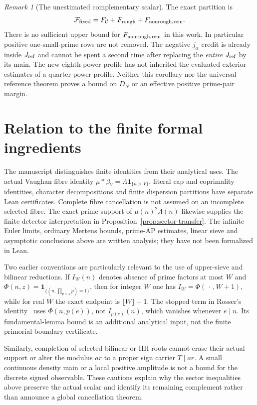 \documentclass[11pt,a4paper]{article}
\theoremstyle{definition}
\theoremstyle{remark}
\newtheorem{remark}[theorem]{Remark}
\begin{document}
\begin{remark}[The unestimated complementary scalar]
The exact partition is
\[
 \mathcal F_{\rm fixed}
       =F_{\mathcal C}+F_{\rm rough}+F_{\rm nonrough,rem}.
\]
There is no sufficient upper bound for $F_{\rm nonrough,rem}$
in this work.  In particular positive one-small-prime rows are
not removed.  The negative $j_\alpha$ credit is already inside
$J_{\rm ref}$ and cannot be spent a second time after replacing
the \emph{entire} $J_{\rm ref}$ by its main.  The new
eighth-power profile has not inherited the evaluated exterior
estimates of a quarter-power profile.  Neither this corollary
nor the universal reference theorem proves a bound on $D_N$
or an effective positive prime-pair margin.
\end{remark}

\section{Relation to the finite formal ingredients}
\label{sec:sector-formal-boundary}

The manuscript distinguishes finite identities from their analytical
uses.  The actual Vaughan fibre identity
$\mu*\beta_V=\Lambda\mathbf1_{\{n>V\}}$, literal cap and
coprimality identities, character decompositions and finite
dispersion partitions have separate Lean certificates.  Complete
fibre cancellation is not assumed on an incomplete selected fibre.
The exact prime support of $\mu(n)^2\Lambda(n)$ likewise supplies
the finite detector interpretation in Proposition~\ref{prop:sector-transfer}.
The infinite Euler limits, ordinary Mertens bounds, prime-AP estimates,
linear sieve and asymptotic conclusions above are written analysis;
they have not been formalized in Lean.

Two earlier conventions are particularly relevant to the use of
upper-sieve and bilinear reductions.  If $I_W(n)$ denotes absence
of prime factors at most $W$ and
$\Phi(n,z)=\mathbf1_{\{(n,\prod_{p<z}p)=1\}}$, then for integer
$W$ one has $I_W=\Phi(\,\cdot\,,W+1)$, while for real $W$ the
exact endpoint is $\lfloor W\rfloor+1$.  The stopped term in
Rosser's identity~\cite[Lemma 8]{Motohashi} uses $\Phi(n,p(e))$,
not $I_{p(e)}(n)$, which vanishes whenever $e\mid n$.  Its
fundamental-lemma bound is an additional analytical input, not
the finite primorial-boundary certificate.

Similarly, completion of selected bilinear or HH roots cannot
erase their actual support or alter the modulus $ar$ to a proper
sign carrier $T\mid ar$.  A small continuous density main or a
local positive amplitude is not a bound for the discrete signed
observable.  These cautions explain why the sector inequalities
above preserve the actual scalar and identify its remaining
complement rather than announce a global cancellation theorem.
\end{document}
